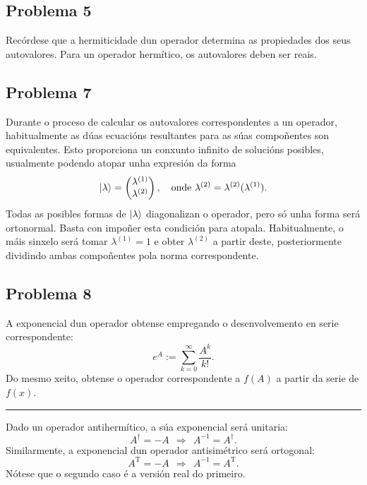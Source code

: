 \documentclass[a4paper,12pt]{article}
\begin{document}
\subsection*{Problema 5}

Recórdese que a hermiticidade dun operador determina as propiedades dos seus autovalores. Para un operador hermítico, os autovalores deben ser reais.

\subsection*{Problema 7}

Durante o proceso de calcular os autovalores correspondentes a un operador, habitualmente as dúas ecuacións resultantes para as súas compoñentes son equivalentes. Esto proporciona un conxunto infinito de solucións posibles, usualmente podendo atopar unha expresión da forma
\begin{equation}
	\ket{\lambda} = \begin{pmatrix} \lambda^{(1)} \\ \lambda^{(2)} \end{pmatrix}, ~~~ \text{onde}~ \lambda^{(2)} = \lambda^{(2)}(\lambda^{(1)} ). 
\end{equation}
\noindent
Todas as posibles formas de $\ket{\lambda}$ diagonalizan o operador, pero só unha forma será ortonormal. Basta con impoñer esta condición para atopala. Habitualmente, o máis sinxelo será tomar $\lambda^{(1)} = 1$ e obter $\lambda^{(2)}$ a partir deste, posteriormente dividindo ambas compoñentes pola norma correspondente.

\subsection*{Problema 8}

A exponencial dun operador obtense empregando o desenvolvemento en serie correspondente:
\begin{equation}
	e^A := \sum_{k=0}^\infty \frac{A^k}{k!}.
\end{equation}
\noindent
Do mesmo xeito, obtense o operador correspondente a $f(A)$ a partir da serie de $f(x)$.

\begin{center} \hrule \end{center}

Dado un operador antihermítico, a súa exponencial será unitaria:
\begin{equation}
	A^\dagger = -A ~~ \Longrightarrow ~~ A^{-1} = A^\dagger.
\end{equation}
\noindent
Similarmente, a exponencial dun operador antisimétrico será ortogonal:
\begin{equation}
	A^\mathrm{T} = -A ~~ \Longrightarrow ~~ A^{-1} = A^\mathrm{T}.
\end{equation}
\noindent
Nótese que o segundo caso é a versión real do primeiro.
\end{document}

